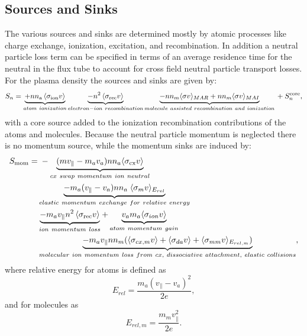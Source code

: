 \documentclass[amsmath,amssymb,a4]{revtex4-2}
\begin{document}
\subsection{Sources and Sinks}
The various sources and sinks are determined mostly by atomic processes like charge exchange, ionization, excitation, and recombination. In addition a neutral particle loss term can be specified in terms of an average residence time for the neutral in the flux tube to account for cross field neutral particle transport losses. For the plasma density the sources and sinks are given by:
\begin{equation}\label{particle_source}
    S_n=\underbrace{+n n_{\mathrm{a}}\left\langle\sigma_{\mathrm{ion}} v\right\rangle}_{atom~ionization}\underbrace{-n^2\left\langle\sigma_{\mathrm{rec}} v\right\rangle}_{electron-ion ~recombination}  \underbrace{- nn_m\langle\sigma v \rangle_{MAR} + nn_m\langle\sigma v \rangle_{MAI}}_{molecule~ assisted ~recombination~ and~ ionization} \\
     \\
    +S^{\rm core}_{n},
\end{equation}
with a core source added to the ionization recombination contributions of the atoms and molecules.
Because the neutral particle momentum is neglected there is no momentum source, while the momentum sinks are induced by:
\begin{equation}
\begin{aligned}
     S_{\rm mom} = & \; -\underbrace{(mv_\parallel-m_av_a)n n_a \langle\sigma_{\rm{cx}}v\rangle}_{cx~swap~momentum~ion~neutral} \\
     &\underbrace{-m_a(v_\parallel-v_a)nn_a \;\langle\sigma_m v\rangle _{E_{rel}}}_{elastic~momentum~exchange~for~relative~energy} \\
     &\underbrace{-m_av_\parallel n^2\left\langle\sigma_{\mathrm{rec}} v\right\rangle}_{ion ~momentum ~loss}+ \underbrace{v_am_a\langle \sigma_{ion}v\rangle}_{atom~ momentum~gain} \\
     & \underbrace{- m_a v_\parallel nn_m(\langle\sigma_{cx,m} v \rangle+\langle\sigma_{da} v \rangle +\langle\sigma_{mm} v\rangle_{E_{rel,m}})}_{molecular ~ion ~momentum~ loss~ from~ cx,~dissociative~attachment,~elastic~collisions} ,
\end{aligned}
\label{eq:momentum_source}
\end{equation}
    where relative energy for atoms is defined as
\begin{equation}
    E_{rel} = \frac{m_a(v_\parallel-v_a)^2}{2e},
\end{equation}
and for molecules as
\begin{equation}
    E_{rel,m} = \frac{m_mv_\parallel^2}{2e}.
\end{equation}
\end{document}

